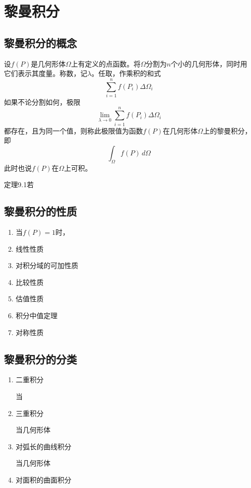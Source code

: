 
\section{黎曼积分}
\subsection{黎曼积分的概念}

设$f(P)$是几何形体$\varOmega$上有定义的点函数。将$\varOmega$分割为$n$个小的几何形体，同时用它们表示其度量。称数，记$\lambda$。任取，作乘积的和式
\[
\sum_{i=1}^{n}f(P_i)\Delta\varOmega_i
\]
如果不论分割如何，极限
\[
\lim_{\lambda\rightarrow0}\sum_{i=1}^{n}f(P_i)\Delta\varOmega_i
\]
都存在，且为同一个值，则称此极限值为函数$f(P)$在几何形体$\varOmega$上的黎曼积分，即
\[
\int_\varOmega f(P)\,d\varOmega
\]
此时也说$f(P)$在$\varOmega$上可积。

定理9.1\quad 若

\subsection{黎曼积分的性质}
\begin{enumerate}
    \item 当$f(P)=1$时，
    \item 线性性质
    \item 对积分域的可加性质
    \item 比较性质
    \item 估值性质
    \item 积分中值定理
    \item 对称性质
\end{enumerate}

\subsection{黎曼积分的分类}
\begin{enumerate}
    \item 二重积分

当

    \item 三重积分

当几何形体

    \item 对弧长的曲线积分

当几何形体

    \item 对面积的曲面积分
\end{enumerate}

